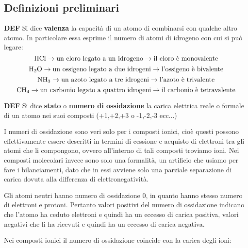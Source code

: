 \subsection{Definizioni preliminari}
\textbf{DEF} Si dice \textbf{valenza} la capacità di un atomo di combinarsi con qualche altro atomo. In particolare essa esprime il numero di atomi di idrogeno con cui si può legare:
$$\ce{HCl} \rightarrow \text{un cloro legato a un idrogeno} \rightarrow \text{il cloro è monovalente}$$
$$\ce{H_2O} \rightarrow \text{un ossigeno legato a due idrogeni} \rightarrow \text{l'ossigeno è bivalente}$$
$$\ce{NH_3} \rightarrow \text{un azoto legato a tre idrogeni} \rightarrow \text{l'azoto è trivalente}$$
$$\ce{CH_4} \rightarrow \text{un carbonio legato a quattro idrogeni} \rightarrow \text{il carbonio è tetravalente}$$

\textbf{DEF} Si dice \textbf{stato} o \textbf{numero di ossidazione} la carica elettrica reale o formale di un atomo nei suoi composti (+1,+2,+3 o -1,-2,-3 ecc...)

\vspace{0.2cm}I numeri di ossidazione sono veri solo per i composti ionici, cioè questi possono effettivamente essere descritti in termini di cessione e acquisto di elettroni tra gli atomi che li compongono, ovvero all'interno di tali composti troviamo ioni. Nei composti molecolari invece sono solo una formalità, un artificio che usiamo per fare i bilanciamenti, dato che in essi avviene solo una parziale separazione di carica dovuta alla differenza di elettronegatività.

\vspace{0.2cm}Gli atomi neutri hanno numero di ossidazione 0, in quanto hanno stesso numero di elettroni e protoni. Pertanto valori positivi del numero di ossidazione indicano che l'atomo ha ceduto elettroni e quindi ha un eccesso di carica positiva, valori negativi che li ha ricevuti e quindi ha un eccesso di carica negativa.

Nei composti ionici il numero di ossidazione coincide con la carica degli ioni:

